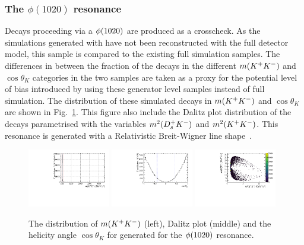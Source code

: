 \subsubsection{The $\phi(1020)$ resonance} 
Decays proceeding via a $\phi(1020)$ are produced as a crosscheck. As the simulations generated with \laurapp have not been reconstructed with the full \lhcb detector model, this sample is compared to the existing full simulation samples. The differences in between the fraction of the decays in the different $m({{K}^+}{{K}^-})$ and $\cos\theta_{K}$ categories in the two samples are taken as a proxy for the potential level of bias introduced by using these generator level samples instead of full simulation. The distribution of these simulated decays in $m({{K}^+}{{K}^-})$ and $\cos\theta_{K}$ are shown in Fig.~\ref{fig:DsKK_model_phi1020}. This figure also include the Dalitz plot distribution of the decays parametrised with the variables $m^{2}({{D}^+_{s}}{{K}^-})$ and $m^{2}({{K}^+}{{K}^-})$.
This resonance is generated with a Relativistic Breit-Wigner line shape~\cite{RelBWPhysRev.49.519}.
\begin{figure}[!h]
   \centering   
   \includegraphics[width=0.32\textwidth]{figs/B2DsPhi/phi_phi_mass.pdf}
   \includegraphics[width=0.32\textwidth]{figs/B2DsPhi/phi_Helicity.pdf}
   \includegraphics[width=0.32\textwidth]{figs/B2DsPhi/phi_Dalitz_plot.pdf}
   \caption{The distribution of $m({{K}^+}{{K}^-})$ (left), Dalitz plot (middle) and the helicity angle $\cos\theta_{K}$ for generated for the $\phi(1020)$ resonance.} 
   \label{fig:DsKK_model_phi1020}   
\end{figure}

